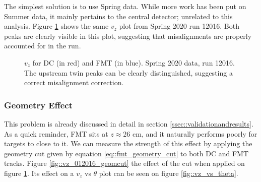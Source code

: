         The simplest solution is to use Spring data.
        While more work has been put on Summer data, it mainly pertains to the central detector; unrelated to this analysis.
        Figure \ref{fig::vz_012016} shows the same $v_z$ plot from Spring 2020 run 12016.
        Both peaks are clearly visible in this plot, suggesting that misalignments are properly accounted for in the run.

        \begin{figure}[t!]
            \centering{}
            \caption[$v_z$ for DC and FMT, run 12016]{$v_z$ for DC (in red) and FMT (in blue). Spring 2020 data, run 12016. The upstream twin peaks can be clearly distinguished, suggesting a correct misalignment correction.}
            \label{fig::vz_012016}
        \end{figure}

    \subsubsection{Geometry Effect}
        This problem is already discussed in detail in section \ref{ssec::validationandresults}.
        As a quick reminder, FMT sits at $z \approx 26$ cm, and it naturally performs poorly for targets to close to it.
        We can measure the strength of this effect by applying the geometry cut given by equation \eqref{eq::fmt_geometry_cut} to both DC and FMT tracks.
        Figure \ref{fig::vz_012016_geomcut} the effect of the cut when applied on figure \ref{fig::vz_012016}.
        Its effect on a $v_z$ vs $\theta$ plot can be seen on figure \ref{fig::vz_vs_theta}.

